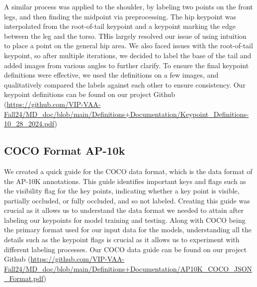 \documentclass[conference]{IEEEtran}
\begin{document}
A similar process was applied to the shoulder, by labeling two points on the front legs, and then finding the midpoint via preprocessing.
The hip keypoint was interpolated from the root-of-tail keypoint and a keypoint marking the edge between the leg and the torso. THis largely resolved our issue of using intuition to place a point on the general hip area.
We also faced issues with the root-of-tail keypoint, so after multiple iterations, we decided to label the base of the tail and added images from various angles to further clarify.
To ensure the final keypoint definitions were effective, we used the definitions on a few images, and qualitatively compared the labels against each other to ensure consistency. Our keypoint definitions can be found on our project Github\cite{github} (\url{https://github.com/VIP-VAA-Fall24/MD_doc/blob/main/Definitions+Documentation/Keypoint_Definitions-10_28_2024.pdf})

\subsection{COCO Format AP-10k}
We created a quick guide for the COCO data format, which is the data format of the AP-10K annotations.
This guide identifies important keys and flags such as the visibility flag for the key points, indicating whether a key point is visible, partially occluded, or fully occluded, and so not labeled. Creating this guide was crucial as it allows us to understand the data format we needed to attain after labeling our keypoints for model training and testing. Along with COCO being the primary format used for our input data for the models, understanding all the details such as the keypoint flags is crucial as it allows us to experiment with different labeling processes. Our COCO data guide can be found on our project Github\cite{github}
(\url{https://github.com/VIP-VAA-Fall24/MD_doc/blob/main/Definitions+Documentation/AP10K_COCO_JSON_Format.pdf})
\end{document}
